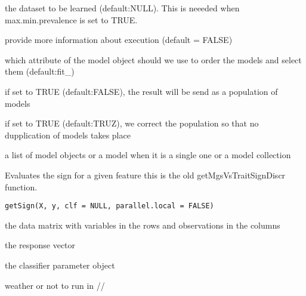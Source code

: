 \documentclass[a4paper]{book}
\begin{document}
\begin{Arguments}
\begin{ldescription}
\item[\code{X:}] the dataset to be learned (default:NULL). This is neeeded when max.min.prevalence is set to TRUE.

\item[\code{verbose:}] provide more information about execution (default = FALSE)

\item[\code{evalToOrder:}] which attribute of the model object should we use to order the models and select them (default:fit\_)

\item[\code{return.population:}] if set to TRUE (default:FALSE), the result will be send as a population of models

\item[\code{unique.control:}] if set to TRUE (default:TRUZ), we correct the population so that no dupplication of models takes place
\end{ldescription}
\end{Arguments}
%
\begin{Value}
a list of model objects or a model when it is a single one or a model collection
\end{Value}
%
\begin{Description}
Evaluates the sign for a given feature this is the old getMgsVsTraitSignDiscr function.
\end{Description}
%
\begin{Usage}
\begin{verbatim}
getSign(X, y, clf = NULL, parallel.local = FALSE)
\end{verbatim}
\end{Usage}
%
\begin{Arguments}
\begin{ldescription}
\item[\code{X:}] the data matrix with variables in the rows and observations in the columns

\item[\code{y:}] the response vector

\item[\code{clf:}] the classifier parameter object

\item[\code{parallel.local:}] weather or not to run in //
\end{ldescription}
\end{Arguments}
\end{document}
